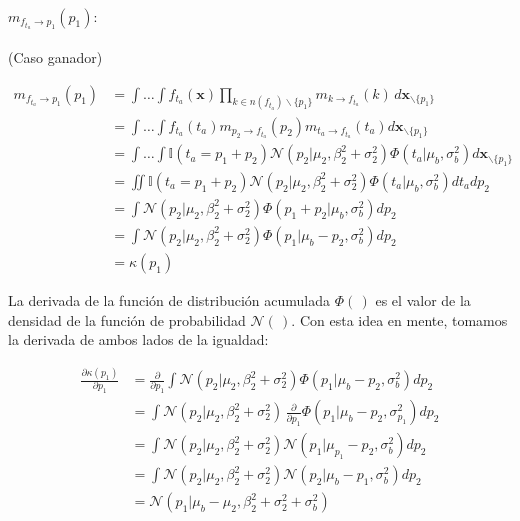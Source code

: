 \documentclass[11pt,twoside,spanish]{report} %
\begin{document}
\paragraph{$m_{f_{t_a} \rightarrow p_1}(p_1):$} (Caso ganador)

\begin{equation}
	\begin{split}
		m_{f_{t_a} \rightarrow p_1}(p_1)  & = \int \dots \int f_{t_a}(\textbf{x}) \prod_{k\in n(f_{t_a})\backslash\{p_1\}} m_{k\rightarrow f_{t_a}}(k) \, d\textbf{x}_{\backslash \{p_1\} }  \\
		&= \int \dots \int f_{t_a}(t_a) m_{p_2\rightarrow f_{t_a}}(p_2)m_{t_a\rightarrow f_{t_a}}(t_a)d\textbf{x}_{\backslash \{p_1\} }\\
		&= \int \dots \int \mathbb{I}( t_a = p_1 + p_2) \mathcal{N}(p_2| \mu_2, \beta_2^2 + \sigma_2^2 )  \Phi (t_a| \mu_b , \sigma_b^2 )  d\textbf{x}_{\backslash \{p_1\} }\\
		&= \iint \mathbb{I}( t_a = p_1 + p_2)  \mathcal{N}(p_2| \mu_2, \beta_2^2 + \sigma_2^2 )  \Phi (t_a| \mu_b , \sigma_b^2 )  dt_a dp_2 \\
		&= \int   \mathcal{N}(p_2| \mu_2, \beta_2^2 + \sigma_2^2 )  \Phi (p_1 + p_2| \mu_b , \sigma_b^2 )  dp_2 \\
		&= \int  \mathcal{N}(p_2| \mu_2, \beta_2^2 + \sigma_2^2 )  \Phi (p_1 | \mu_b - p_2 , \sigma_b^2)  dp_2 \\
		&= \kappa(p_1)
	\end{split}
\end{equation}

La derivada de la funci\'on de distribuci\'on acumulada $\Phi(\,)$ es el valor de la densidad de la funci\'on de probabilidad $\mathcal{N}(\,)$. Con esta idea en mente, tomamos la derivada de ambos lados de la igualdad:

\begin{equation}\label{eq:ta-p_derivada}
	\begin{split}
		\frac{\partial\kappa(p_1)}{\partial p_1} &= \frac{\partial}{\partial p_1} \int  \mathcal{N}(p_2| \mu_{2}, \beta_2^2 + \sigma_{2}^2 )    \Phi (p_1 | \mu_b -p_2 ,  \sigma_{b}^2 )  dp_2 \\
		&= \int  \mathcal{N}(p_2| \mu_2,\beta_2^2 + \sigma_2^2 ) \, \frac{\partial}{\partial p_1} \Phi (p_1| \mu_{b} - p_2, \sigma_{p_1}^2 )   dp_2   \\
		&= \int  \mathcal{N}(p_2| \mu_{2}, \beta_2^2 +\sigma_{2}^2 )  \mathcal{N}(p_1| \mu_{p_1} -p_2 , \sigma_b^2)   dp_2  \\
		& = \int  \mathcal{N}(p_2| \mu_{2}, \beta_2^2 +\sigma_2^2 )  \mathcal{N}(p_2| \mu_{b}  -p_1 , \sigma_b^2)   dp_2  \\
		&= \mathcal{N}(p_1| \mu_{b} - \mu_{2}, \beta_2^2+\sigma_2^2 + \sigma_{b}^2)
	\end{split}
\end{equation}
\end{document}
